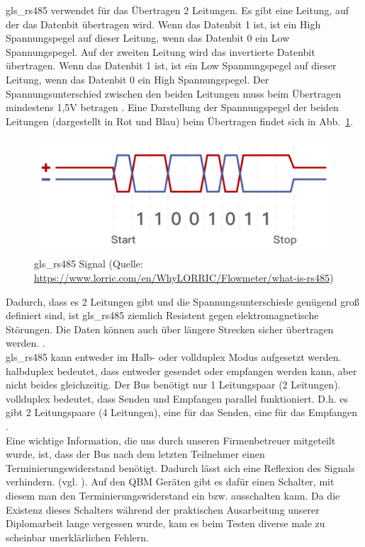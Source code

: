 \gls{gls_rs485} verwendet für das Übertragen 2 Leitungen. Es gibt eine Leitung, auf der das Datenbit übertragen wird. Wenn das Datenbit 1 ist, ist ein High Spannungspegel auf dieser Leitung, wenn das Datenbit 0 ein Low Spannungspegel. Auf der zweiten Leitung wird das invertierte Datenbit übertragen. Wenn das Datenbit 1 ist, ist ein Low Spannungspegel auf dieser Leitung, wenn das Datenbit 0 ein High Spannungspegel. Der Spannungsunterschied zwischen den beiden Leitungen muss beim Übertragen mindestens 1,5V betragen \cite{Kugelstadt:2021}. 
Eine Darstellung der Spannungspegel der beiden Leitungen (dargestellt in Rot und Blau) beim Übertragen findet sich in Abb.~\ref{fig:rs485_signal}.
\begin{figure}[H]
	\centering
	\includegraphics[width=0.5\linewidth]{Bilder/RS485_signal_illustration}
	\caption{\gls{gls_rs485} Signal (Quelle: \url{https://www.lorric.com/en/WhyLORRIC/Flowmeter/what-is-rs485})}
	\label{fig:rs485_signal}
\end{figure}

Dadurch, dass es 2 Leitungen gibt und die Spannungsunterschiede genügend groß definiert sind, ist \gls{gls_rs485} ziemlich Resistent gegen elektromagnetische Störungen. Die Daten können auch über längere Strecken sicher übertragen werden. \cite{Kugelstadt:2021, Heinen_Elektronik_GmbH:o.J.}. \\

\gls{gls_rs485} kann entweder im Halb- oder \gls{vollduplex} Modus aufgesetzt werden. \newline \gls{halbduplex} bedeutet, dass entweder gesendet oder empfangen werden kann, aber nicht beides gleichzeitig. Der Bus benötigt nur 1 Leitungspaar (2 Leitungen). \newline \gls{vollduplex} bedeutet, dass Senden und Empfangen parallel funktioniert. D.h. es gibt 2 Leitungspaare (4 Leitungen), eine für das Senden, eine für das Empfangen \cite{Kugelstadt:2021}. \\

Eine wichtige Information, die uns durch unseren Firmenbetreuer mitgeteilt wurde, ist, dass der Bus nach dem letzten Teilnehmer einen Terminierungswiderstand benötigt. Dadurch lässt sich eine Reflexion des Signals verhindern. (vgl. \cite{Kugelstadt:2021}). Auf den QBM Geräten gibt es dafür einen Schalter, mit diesem man den Terminierungswiderstand ein bzw. ausschalten kann. Da die Existenz dieses Schalters während der praktischen Ausarbeitung unserer Diplomarbeit lange vergessen wurde, kam es beim Testen diverse male zu scheinbar unerklärlichen Fehlern.

